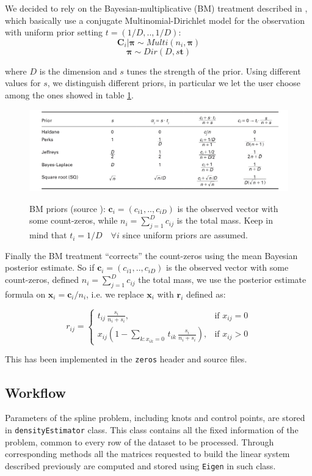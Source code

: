We decided to rely on the Bayesian-multiplicative (BM) treatment described in \cite{fernandez:zeros}, which basically use a conjugate Multinomial-Dirichlet model for the observation with uniform prior setting $t=(1/D,..,1/D)$:
\[ \bm{C}_{i}|\bm{\pi} \sim Multi(n_{i},\bm{\pi})  \]
\[ \bm{\pi} \sim Dir(D,s\bm{t}) \]

where $D$ is the dimension and $s$ tunes the strength of the prior. Using different values for $s$, we distinguish different priors, in particular we let the user choose among the ones showed in table \ref{fig:priors}.

\begin{figure}[ht]
	
	
	\includegraphics[width=\textwidth]{./pictures/BM/BMpriors.png}
	\label{fig:priors}
	
	\caption{BM priors (source \cite{fernandez:zeros}): $\bm{c}_{i}=(c_{i1},..,c_{iD})$ is the observed vector with some count-zeros, while $n_{i}=\sum_{j=1}^{D}c_{ij}$ is the total mass. Keep in mind that $t_{i}=1/D \quad \forall i$ since uniform priors are assumed.}
	\label{fig:priors}
	
\end{figure}

Finally the BM treatment ``corrects'' the count-zeros using the mean Bayesian posterior estimate. So if $\bm{c}_{i}=(c_{i1},..,c_{iD})$ is the observed vector with some count-zeros, defined $n_{i}=\sum_{j=1}^{D}c_{ij}$ the total mass, we use the posterior estimate formula on $\bm{x}_{i}=\bm{c}_{i}/n_{i}$, i.e. we replace $\bm{x}_{i}$ with $\bm{r}_{i}$ defined as:

\[ r_{ij} = 
\begin{cases} 
t_{ij} \, \frac{s_{i}}{n_{i}+s_{i}}, & \mbox{if } x_{ij}=0 \\ 
x_{ij}(1-\sum_{k:x_{ik}=0} \, t_{ik} \, \frac{s_{i}}{n_{i}+s_{i}}), & \mbox{if } x_{ij}>0 
\end{cases} \]

This has been implemented in the \verb|zeros| header and source files.

\subsection{Workflow} \label{workflow}
Parameters of the spline problem, including knots and control points, are stored in \verb|densityEstimator| class. This class contains all the fixed information of the problem, common to every row of the dataset to be processed. Through corresponding methods all the matrices requested to build the linear system described previously are computed and stored using \verb|Eigen| in such class.

